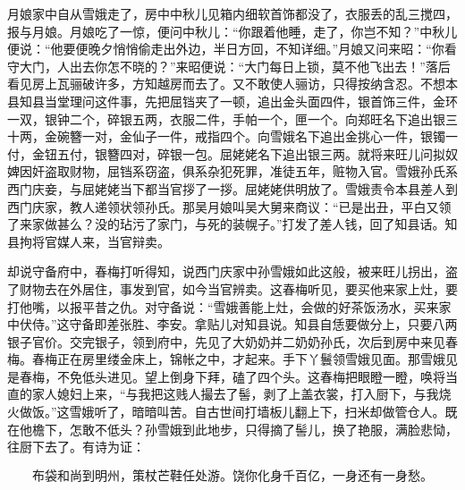 月娘家中自从雪娥走了，房中中秋儿见箱内细软首饰都没了，衣服丢的乱三搅四，报与月娘。月娘吃了一惊，便问中秋儿：“你跟着他睡，走了，你岂不知？”中秋儿便说：“他要便晚夕悄悄偷走出外边，半日方回，不知详细。”月娘又问来昭：“你看守大门，人出去你怎不晓的？”来昭便说：“大门每日上锁，莫不他飞出去！”落后看见房上瓦骊破许多，方知越房而去了。又不敢使人骊访，只得按纳含忍。不想本县知县当堂理问这件事，先把屈铛夹了一顿，追出金头面四件，银首饰三件，金环一双，银钟二个，碎银五两，衣服二件，手帕一个，匣一个。向郑旺名下追出银三十两，金碗簪一对，金仙子一件，戒指四个。向雪娥名下追出金挑心一件，银镯一付，金钮五付，银簪四对，碎银一包。屈姥姥名下追出银三两。就将来旺儿问拟奴婢因奸盗取财物，屈铛系窃盗，俱系杂犯死罪，准徒五年，赃物入官。雪娥孙氏系西门庆妾，与屈姥姥当下都当官拶了一拶。屈姥姥供明放了。雪娥责令本县差人到西门庆家，教人递领状领孙氏。那吴月娘叫吴大舅来商议：“已是出丑，平白又领了来家做甚么？没的玷污了家门，与死的装幌子。”打发了差人钱，回了知县话。知县拘将官媒人来，当官辩卖。

却说守备府中，春梅打听得知，说西门庆家中孙雪娥如此这般，被来旺儿拐出，盗了财物去在外居住，事发到官，如今当官辨卖。这春梅听见，要买他来家上灶，要打他嘴，以报平昔之仇。对守备说：“雪娥善能上灶，会做的好茶饭汤水，买来家中伏侍。”这守备即差张胜、李安。拿贴儿对知县说。知县自恁要做分上，只要八两银子官价。交完银子，领到府中，先见了大奶奶并二奶奶孙氏，次后到房中来见春梅。春梅正在房里缕金床上，锦帐之中，才起来。手下丫鬟领雪娥见面。那雪娥见是春梅，不免低头进见。望上倒身下拜，磕了四个头。这春梅把眼瞪一瞪，唤将当直的家人媳妇上来，“与我把这贱人撮去了髻，剥了上盖衣裳，打入厨下，与我烧火做饭。”这雪娥听了，暗暗叫苦。自古世间打墙板儿翻上下，扫米却做管仓人。既在他檐下，怎敢不低头？孙雪娥到此地步，只得摘了髻儿，换了艳服，满脸悲恸，往厨下去了。有诗为证：

\[
布袋和尚到明州，策杖芒鞋任处游。
饶你化身千百亿，一身还有一身愁。
\]
